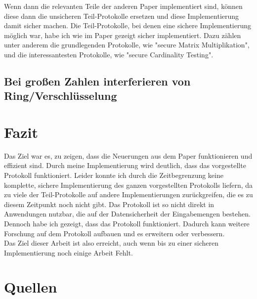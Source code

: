 \documentclass[a4paper,10pt]{scrartcl}
\begin{document}
Wenn dann die relevanten Teile der anderen Paper implementiert sind, können diese dann die unsicheren Teil-Protokolle ersetzen und diese Implementierung damit sicher machen.
Die Teil-Protokolle, bei denen eine sichere Implementierung möglich war, habe ich wie im Paper gezeigt sicher implementiert. Dazu zählen unter anderem die grundlegenden Protokolle, wie "secure Matrix Multiplikation", und die interessantesten Protokolle, wie "secure Cardinality Testing".\\



\subsection{Bei großen Zahlen interferieren von Ring/Verschlüsselung}

\section{Fazit}
Das Ziel war es, zu zeigen, dass die Neuerungen aus dem Paper \cite{Doettling2021} funktionieren und effizient sind. Durch meine Implementierung wird deutlich, dass das vorgestellte Protokoll funktioniert. 
Leider konnte ich durch die Zeitbegrenzung keine komplette, sichere Implementierung des ganzen vorgestellten Protokolls liefern, da zu viele der Teil-Protokolle auf andere Implementierungen zurückgreifen, die es zu diesem Zeitpunkt noch nicht gibt.
Das Protokoll ist so nicht direkt in Anwendungen nutzbar, die auf der Datensicherheit der Eingabemengen bestehen.
Dennoch habe ich gezeigt, dass das Protokoll funktioniert. Dadurch kann weitere Forschung auf dem Protokoll aufbauen und es erweitern oder verbessern.\\
Das Ziel dieser Arbeit ist also erreicht, auch wenn bis zu einer sicheren Implementierung noch einige Arbeit Fehlt.


\section{Quellen}

\end{document}
